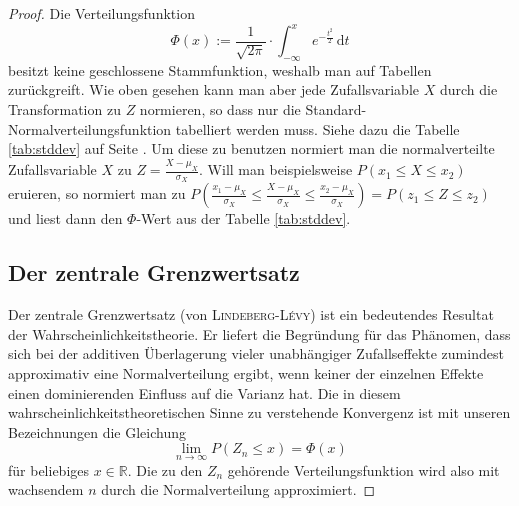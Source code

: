 \documentclass[%
<<<<<<< Updated upstream
<<<<<<< Updated upstream
11pt,%
twoside,%
titlepage,%
german,%
=======
=======
>>>>>>> Stashed changes
11pt,%
twoside,%
titlepage,%
swissgerman,%
<<<<<<< Updated upstream
>>>>>>> Stashed changes
=======
>>>>>>> Stashed changes
headsepline%
]{scrartcl}
\theoremstyle{definition}
\theoremstyle{plain}
\newcounter{theo}[section]\setcounter{theo}{0}
\begin{document}
\begin{proof}
Die Verteilungsfunktion
$$\Phi(x):=\frac{1}{\sqrt{2\pi}}\cdot\int_{-\infty}^{x} e^{-\frac{t^2}{2}}\,\mathrm{d}t$$
besitzt keine geschlossene Stammfunktion, weshalb man auf Tabellen zurückgreift. Wie oben gesehen kann man aber jede Zufallsvariable $X$ durch die Transformation zu $Z$ normieren, so dass nur die Standard-Normalverteilungsfunktion tabelliert werden muss. Siehe dazu die Tabelle \ref{tab:stddev} auf Seite \pageref{tab:stddev}. Um diese zu benutzen normiert man die normalverteilte Zufallsvariable $X$ zu $Z=\frac{X-\mu_{X}}{\sigma_{X}}$. Will man beispielsweise $P(x_{1}\leq X\leq x_{2})$ eruieren, so normiert man zu $P\left(\frac{x_{1}-\mu_{X}}{\sigma_{X}}\leq\frac{X-\mu_{X}}{\sigma_{X}}\leq \frac{x_{2}-\mu_{X}}{\sigma_{X}}\right)=P(z_{1}\leq Z\leq z_{2})$ und liest dann den $\Phi$-Wert aus der Tabelle \ref{tab:stddev}.

\subsection{Der zentrale Grenzwertsatz}

Der zentrale Grenzwertsatz (von \textsc{Lindeberg-Lévy}) ist ein bedeutendes Resultat der Wahrscheinlichkeitstheorie. Er liefert die Begründung für das Phänomen, dass sich bei der additiven Überlagerung vieler unabhängiger Zufallseffekte zumindest approximativ eine Normalverteilung ergibt, wenn keiner der einzelnen Effekte einen dominierenden Einfluss auf die Varianz hat. Die in diesem wahrscheinlichkeitstheoretischen Sinne zu verstehende Konvergenz ist mit unseren Bezeichnungen die Gleichung
$$\lim_{n\to\infty} P(Z_n\leq x)=\Phi(x)$$
für beliebiges $x\in\mathbb{R}$.
Die zu den $Z_n$ gehörende Verteilungsfunktion wird also mit wachsendem $n$ durch die Normalverteilung approximiert.

\clearpage


\end{proof}
\end{document}
